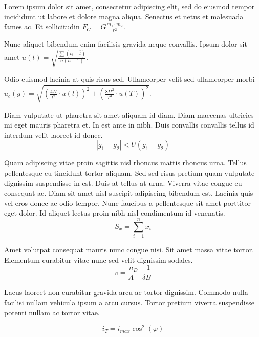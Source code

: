 \documentclass{article}
\begin{document}
Lorem ipsum dolor sit amet, consectetur adipiscing elit, sed do eiusmod tempor incididunt ut labore et dolore magna aliqua. Senectus et netus et malesuada fames ac. Et sollicitudin \begin{math}
	F_{G}=G\frac{m_1\cdot m_2}{r^2}
\end{math}.\newline
 
Nunc aliquet bibendum enim facilisis gravida neque convallis. Ipsum dolor sit amet $ u(t)=\sqrt{\frac{\sum(t_i-\overline{t})}{n(n-1)}} $.\newline
    
Odio euismod lacinia at quis risus sed. Ullamcorper velit sed ullamcorper morbi \( u_c(g)=\sqrt{(\frac{4\Pi}{t^2}\cdot u(l))^2+(\frac{8\Pi^2}{T^3}\cdot u(T))^2} \).\newline

Diam vulputate ut pharetra sit amet aliquam id diam. Diam maecenas ultricies mi eget mauris pharetra et. In est ante in nibh. Duis convallis convallis tellus id interdum velit laoreet id donec. 
\[ |g_1-g_2|<U(g_1-g_2) \]

Quam adipiscing vitae proin sagittis nisl rhoncus mattis rhoncus urna. Tellus pellentesque eu tincidunt tortor aliquam. Sed sed risus pretium quam vulputate dignissim suspendisse in est. Duis at tellus at urna. Viverra vitae congue eu consequat ac. Diam sit amet nisl suscipit adipiscing bibendum est. Lacinia quis vel eros donec ac odio tempor. Nunc faucibus a pellentesque sit amet porttitor eget dolor. Id aliquet lectus proin nibh nisl condimentum id venenatis.
$$ S_x=\sum_{i=1}^{n}x_i $$

Amet volutpat consequat mauris nunc congue nisi. Sit amet massa vitae tortor. Elementum curabitur vitae nunc sed velit dignissim sodales. 
\begin{displaymath}
	v=\frac{n_D-1}{A+\delta B}
\end{displaymath}

Lacus laoreet non curabitur gravida arcu ac tortor dignissim. Commodo nulla facilisi nullam vehicula ipsum a arcu cursus. Tortor pretium viverra suspendisse potenti nullam ac tortor vitae. 

\begin{equation}
	i_T=i_{max}\cos ^2(\varphi)
\end{equation}
\end{document}
